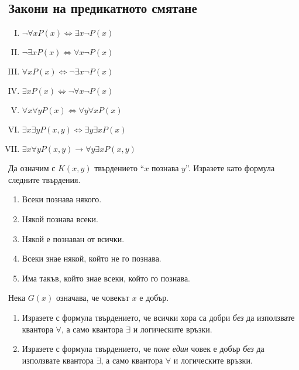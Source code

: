 \subsection*{Закони на предикатното смятане}

\begin{enumerate}[(I)]
  \item
    $\neg\forall x P(x) \iff \exists x \neg P(x)$
  \item
    $\neg\exists x P(x) \iff \forall x \neg P(x)$
  \item
    $\forall x P(x) \iff \neg\exists x \neg P(x)$
  \item
    $\exists x P(x) \iff \neg\forall x \neg P(x)$
  \item
    $\forall x \forall y P(x) \iff \forall y\forall x P(x)$
  \item
    $\exists x\exists y P(x,y) \iff \exists y \exists x P(x)$  
  \item
    $\exists x\forall y P(x,y) \rightarrow \forall y \exists x P(x,y)$
\end{enumerate}


\begin{problem}
  Да означим с $K(x,y)$ твърдението ``$x$ познава $y$''.
  Изразете като формула следните твърдения.
  \begin{enumerate}[1)]
  \item
    Всеки познава някого.
  \item
    Някой познава всеки.
  \item
    Някой е познаван от всички.
  \item
    Всеки знае някой, който не го познава.
  \item
    Има такъв, който знае всеки, който го познава.
  \end{enumerate}
\end{problem}

\begin{problem}
  Нека $G(x)$ означава, че човекът $x$ е добър.
  \begin{enumerate}[1)]
  \item
    Изразете с формула твърдението, че всички хора са добри {\em без}
    да използвате квантора $\forall$, а само квантора $\exists$ и логическите връзки.
  \item
    Изразете с формула твърдението, че {\em поне един} човек е добър {\em без}
    да използвате квантора $\exists$, а само квантора $\forall$ и логическите връзки.
  \end{enumerate}
\end{problem}


